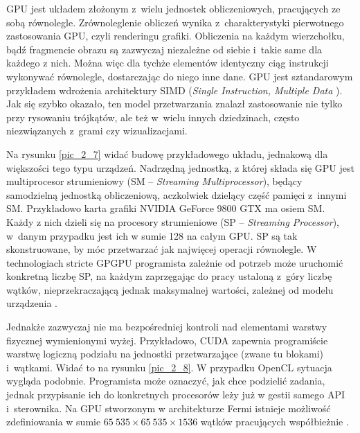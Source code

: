 		
		GPU jest układem złożonym z~wielu jednostek obliczeniowych, pracujących ze sobą równolegle. Zrównoleglenie obliczeń wynika z~charakterystyki pierwotnego zastosowania GPU, czyli renderingu grafiki. Obliczenia na każdym wierzchołku, bądź fragmencie obrazu są zazwyczaj niezależne od siebie i~takie same dla każdego z nich. Można więc dla tychże elementów identyczny ciąg instrukcji wykonywać równolegle, dostarczając do niego inne dane. GPU jest sztandarowym przykładem wdrożenia architektury SIMD (\emph{Single Instruction, Multiple Data} \cite{simd}). Jak się szybko okazało, ten model przetwarzania znalazł zastosowanie nie tylko przy rysowaniu trójkątów, ale też w~wielu innych dziedzinach, często niezwiązanych z~grami czy wizualizacjami.
		
		Na rysunku \ref{pic_2_7} widać budowę przykładowego układu, jednakową dla większości tego typu urządzeń. Nadrzędną jednostką, z której składa się GPU jest multiprocesor strumieniowy (SM -- \emph{Streaming Multiprocessor}), będący samodzielną jednostką obliczeniową, aczkolwiek dzielący część pamięci z~innymi SM. Przykładowo karta grafiki NVIDIA GeForce 9800 GTX ma osiem SM. Każdy z nich dzieli się na procesory strumieniowe (SP -- \emph{Streaming Processor}), w~danym przypadku jest ich w sumie 128 na całym GPU. SP są tak skonstruowane, by móc przetwarzać jak najwięcej operacji równolegle. W technologiach stricte GPGPU programista zależnie od potrzeb może uruchomić konkretną liczbę SP, na każdym zaprzęgając do pracy ustaloną z~góry liczbę wątków, nieprzekraczającą jednak maksymalnej wartości, zależnej od modelu urządzenia \cite{cuda}.
		
		
		Jednakże zazwyczaj nie ma bezpośredniej kontroli nad elementami warstwy fizycznej wymienionymi wyżej. Przykładowo, CUDA zapewnia programiście warstwę logiczną podziału na jednostki przetwarzające (zwane tu blokami) i~wątkami. Widać to na rysunku \ref{pic_2_8}. W przypadku OpenCL sytuacja wygląda podobnie. Programista może oznaczyć, jak chce podzielić zadania, jednak przypisanie ich do konkretnych procesorów leży już w gestii samego API i~sterownika. Na GPU stworzonym w architekturze Fermi istnieje możliwość zdefiniowania w sumie \(65\ 535 \times 65\ 535 \times 1536\) wątków pracujących współbieżnie \cite{cuda}.\newpage
		
